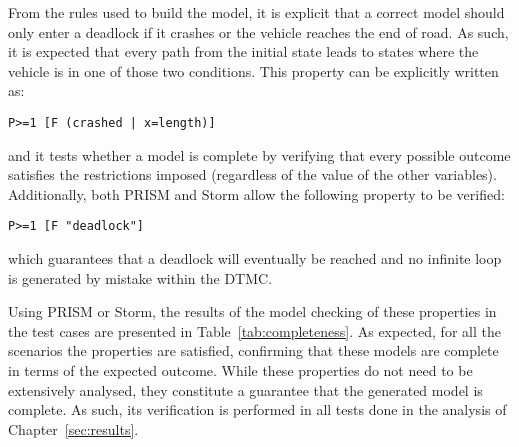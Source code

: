 From the rules used to build the model, it is explicit that a correct model should only enter a deadlock if it crashes or the vehicle reaches the end of road. As such, it is expected that every path from the initial state leads to states where the vehicle is in one of those two conditions. This property can be explicitly written as:

\begin{minipage}{\linewidth}
{\vspace{1em}
\begin{lstlisting}
P>=1 [F (crashed | x=length)]
\end{lstlisting}
}
\end{minipage}

and it tests whether a model is complete by verifying that every possible outcome satisfies the restrictions imposed (regardless of the value of the other variables). Additionally, both PRISM and Storm allow the following property to be verified:

\begin{minipage}{\linewidth}
{\vspace{1em}
\begin{lstlisting}
P>=1 [F "deadlock"]
\end{lstlisting}
}
\end{minipage}

which guarantees that a deadlock will eventually be reached and no infinite loop  is generated by mistake within the DTMC.

Using PRISM or Storm, the results of the model checking of these properties in the test cases are presented in Table~\ref{tab:completeness}. As expected, for all the scenarios the properties are satisfied, confirming that these models are complete in terms of the expected outcome. While these properties do not need to be extensively analysed, they constitute a guarantee that the generated model is complete. As such, its verification is performed in all tests done in the analysis of Chapter~\ref{sec:results}.

